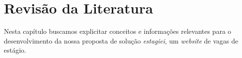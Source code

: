 \chapter{Revisão da Literatura}
Nesta capítulo buscamos explicitar conceitos e informações relevantes para o desenvolvimento da nossa proposta de solução \emph{estagiei}, um \emph{website} de vagas de estágio.
\begin{comment}
Todos trabalhos devem possuir a revisão de literatura onde são abordados os estudos feitos com base da literatura (livros, artigos acadêmicos, publicações em periódicos), todos elementos devem ser referenciados por citações.

Diversas referencias utilizadas nesse modelo não deveriam ser utilizadas diretamente em um trabalho acadêmico, mas estão aqui para demonstrar de forma mais clara alguns pontos importantes sobre desenvolvimento de projetos

Cada parágrafo da revisão de literatura deve apresentar uma ideia com base em uma referencia 

Copiar e colocar é plágio. Exceto em casos muito específicos onde utilizamos a citação direta você deve escrever com suas palavras (seu entendimento, parafrasear) o que os autores escreveram na publicação original

Não são abordados aqui itens técnicos que normalmente são vistos em disciplinas anteriores do curso (UML, banco de dados, metodologias de gerenciamento de projeto etc...), esses elementos podem receber citações nos outros capítulos do trabalho. Essa regra não se aplica aos trabalhos de pós graduação quando o tema estiver relacionado a conceitos técnicos.

\end{comment}






%

